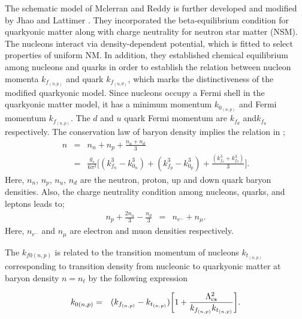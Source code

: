 The schematic model of Mclerran and Reddy \cite{PhysRevLett.122.122701} is further developed and modified by Jhao and Lattimer \cite{PhysRevD.102.023021}. They incorporated the beta-equilibrium condition for quarkyonic matter along with charge neutrality for neutron star matter (NSM). The nucleons interact via density-dependent potential, which is fitted to select properties of uniform NM. In addition, they established chemical equilibrium among nucleons and quarks in order to establish the relation between nucleon momenta $k_{f _{(n,p)}}$ and quark  $k_{f _{(u,d)}}$, which marks the distinctiveness of the modified quarkyonic model. Since nucleons occupy a Fermi shell in the quarkyonic matter model, it has a minimum momentum $k_{0_{(n,p)}} $  and  Fermi momentum $k_{f _{(n,p)}}$. The $d$ and $u$ quark Fermi momentum are $k_{f _d}$ and$k_{f _u}$ respectively. The conservation law of baryon density implies the relation in \cite{PhysRevD.102.023021};
\begin{eqnarray}
	n &=& n_n + n_p + \frac{n_u+n_d}{3}
	\nonumber\\
	&=& \frac{g_s}{6\pi^2}\bigg[(k_{f_{n}}^3-k_{0_{n}}^3)+(k_{f_{p}}^3-k_{0_{p}}^3)+\frac{(k_{f_{u}}^3+k_{f_{d}}^3)}{3}\bigg].  
\end{eqnarray}
Here, $n_n$, $n_p$, $n_u$, $n_d$  are the neutron, proton, up and down quark baryon densities.
Also, the charge neutrality condition among nucleons, quarks, and leptons leads to;
\begin{eqnarray}
	n_p + \frac{2n_{u}}{3} -  \frac{n_{d}}{3}& = & n_{e^{-}} + n_{\mu}.  
\end{eqnarray}
Here, $n_{e^{-}}$  and $n_{\mu}$ are electron and muon densities respectively.

The $k_{f 0(n,p)}$ is related to the transition momentum of nucleons $k_{t_{(n,p)}}$ corresponding to transition density from nucleonic to quarkyonic matter at baryon density $ n = n_t$ by the following expression \cite{PhysRevD.102.023021}

\begin{eqnarray}
	k_{0(n,p)} &=& (k_{f_{(n,p)}}-k_{t_{(n,p)}})\bigg[1+ \frac{\Lambda_{\rm cs}^2}{k_{f_{(n,p)}}k_{t_{(n,p)}}}\bigg].
\end{eqnarray}


